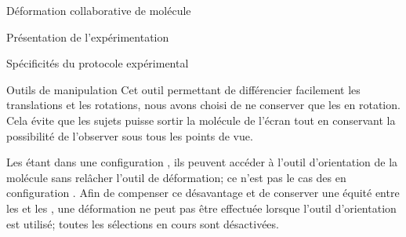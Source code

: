 \documentclass[myfrancais,ngerman,english,french]{mythesis}
\begin{document}
\begin{mychapter}{Déformation collaborative de molécule}
\begin{mysection}{Présentation de l'expérimentation}
\begin{mysubsection}{Spécificités du protocole expérimental}
\begin{mysubsubsection}{Outils de manipulation}
					Cet outil permettant de différencier facilement les translations et les rotations, nous avons choisi de ne conserver que les  en rotation.
					Cela évite que les sujets puisse sortir la molécule de l'écran tout en conservant la possibilité de l'observer sous tous les points de vue.

					Les  étant dans une configuration , ils peuvent accéder à l'outil d'orientation de la molécule sans relâcher l'outil de déformation; ce n'est pas le cas des  en configuration .
					Afin de compenser ce désavantage et de conserver une équité entre les  et les , une déformation ne peut pas être effectuée lorsque l'outil d'orientation est utilisé; toutes les sélections en cours sont désactivées.


\end{mysubsubsection}
\end{mysubsection}
\end{mysection}
\end{mychapter}
\end{document}
